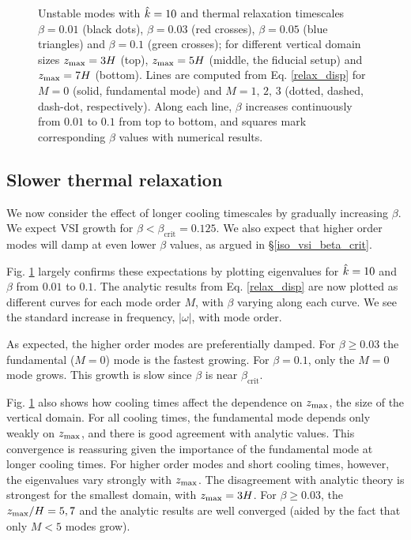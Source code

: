 \begin{figure}
  \caption{Unstable modes with $\hat{k}=10$ and thermal
    relaxation timescales $\beta=0.01$ (black dots), $\beta=0.03$ (red
    crosses), $\beta=0.05$ (blue triangles) and $\beta=0.1$ (green 
    crosses); for different vertical domain sizes $z_\mathrm{max}=3H$ (top),
    $z_\mathrm{max}=5H$ (middle, the fiducial setup) and $z_\mathrm{max}=7H$
    (bottom). Lines are computed from
    Eq. \ref{relax_disp} for  $M=0$ (solid, fundamental mode) and
    $M=1,\,2,\,3$ (dotted, dashed, dash-dot, respectively). Along each
    line, $\beta$ increases continuously from $0.01$ to $0.1$ from top
    to bottom, and squares mark corresponding $\beta$ values with
    numerical results. 
    \label{compare_modes_cool_kx10} 
  }
\end{figure}

\subsection{Slower thermal relaxation}\label{therm_relax_eff}
We now consider the effect of longer cooling timescales by gradually
increasing  
$\beta$. We expect VSI growth for  $\beta < \beta_\mathrm{crit} =
0.125$.  We also expect that higher order modes will damp at even
lower $\beta$ values, as argued in \S\ref{iso_vsi_beta_crit}. 

Fig. \ref{compare_modes_cool_kx10} largely confirms these expectations
by plotting eigenvalues for $\hat{k}=10$  
and $\beta$ from $0.01$ to  $0.1$.  
The analytic results from Eq. \ref{relax_disp} are now plotted as
different curves for each mode order $M$, with $\beta$ varying along
each curve. We see the standard increase in frequency, $|\omega|$,
with mode order. 

As expected, the higher order modes are preferentially damped.  For
$\beta \geq 0.03$ the fundamental ($M = 0$) mode is the fastest
growing. For $\beta = 0.1$, only the $M = 0$ mode grows. This growth
is slow since $\beta$ is near $\beta_\mathrm{crit}$. 

Fig. \ref{compare_modes_cool_kx10} also shows how cooling times affect
the dependence on $z_\mathrm{max}$, the size of the vertical domain.   For all
cooling times, the fundamental mode depends only weakly on $z_\mathrm{max}$,
and there is good agreement with analytic values.  This convergence is
reassuring given the importance of the fundamental mode at longer
cooling times.  For higher order modes and short cooling times,
however, the eigenvalues vary strongly with $z_\mathrm{max}$.  The disagreement
with analytic theory is strongest for the smallest domain, with $z_\mathrm{max}
= 3 H$.  For $\beta \geq 0.03$, the $z_\mathrm{max}/H = 5, 7$ and the analytic
results are well converged (aided by the fact that only $M < 5$ modes
grow). 


